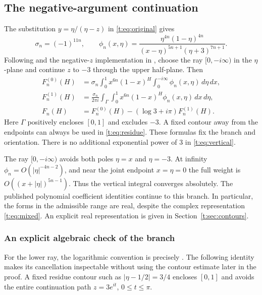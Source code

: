 \documentclass[11pt]{amsart}
\newcommand{\dd}{\,d}
\theoremstyle{plain}
\theoremstyle{remark}\newtheorem{remark}[theorem]{Remark}
\numberwithin{equation}{section}
\begin{document}
\subsection{The negative-argument continuation}\label{t:sec:continuation}
The substitution $y=\eta/(\eta-z)$ in \eqref{t:eq:original} gives
\[
 \sigma_n=(-1)^{11n},\qquad
 \phi_n(x,\eta)=
 \frac{\eta^{4n}(1-\eta)^{4n}}
 {(x-\eta)^{5n+1}(\eta+3)^{7n+1}}.
\]
Following \cite[(2.7)--(2.11)]{VZ18} and the negative-$z$ implementation in \cite[\S2]{RV19}, choose the ray $[0,-i\infty)$ in the
$\eta$-plane and continue $z$ to $-3$ through the upper half-plane. Then
\begin{align}
 F_n^{(0)}(H)&=\sigma_n\int_0^1 x^{6n}(1-x)^H
       \int_0^{-i\infty}\phi_n(x,\eta)\dd\eta\dd x,
       \label{t:eq:vertical}\\
 F_n^{(1)}(H)&=\frac{\sigma_n}{2\pi i}\int_\Gamma\int_0^1
       x^{6n}(1-x)^H\phi_n(x,\eta)\dd x\dd\eta,
       \label{t:eq:residue}\\
 F_n(H)&=F_n^{(0)}(H)-(\log3+i\pi)F_n^{(1)}(H).
       \label{t:eq:mixed}
\end{align}
Here $\Gamma$ positively encloses $[0,1]$ and excludes $-3$. A fixed contour
away from the endpoints can always be used in \eqref{t:eq:residue}.
These formulas fix the branch and orientation. There is no additional
exponential power of $3$ in \eqref{t:eq:vertical}.

The ray $[0,-i\infty)$ avoids both poles $\eta=x$ and $\eta=-3$.
At infinity $\phi_n=O(|\eta|^{-4n-2})$, and near the joint endpoint
$x=\eta=0$ the full weight is $O((x+|\eta|)^{5n-1})$.
Thus the vertical integral converges absolutely. The published polynomial
coefficient identities continue to this branch. In particular, the forms in
the admissible range are real, despite the complex representation
\eqref{t:eq:mixed}. An explicit real representation is given in
Section~\ref{t:sec:contours}.

\subsubsection{An explicit algebraic check of the branch}
For the lower ray, the logarithmic convention is precisely
\cite[(2.10)]{VZ18}. The following identity makes its cancellation inspectable
without using the contour estimate later in the proof. A fixed residue
contour such as $|\eta-1/2|=3/4$ encloses $[0,1]$ and avoids the entire
continuation path $z=3e^{it}$, $0\le t\le\pi$.
\end{document}
